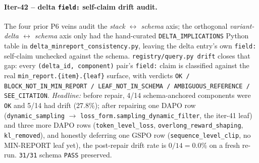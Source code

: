 \paragraph{Iter-42 -- delta \texttt{field:} self-claim drift audit.}
The four prior P6 veins audit the \emph{stack $\leftrightarrow$ schema} axis;
the orthogonal \emph{variant-delta $\leftrightarrow$ schema} axis only had the
hand-curated \texttt{DELTA\_IMPLICATIONS} Python table in
\texttt{delta\_minreport\_consistency.py}, leaving the delta entry's
own \texttt{field:} self-claim unchecked against the schema.
\texttt{registry/query.py drift} closes that gap: every
\texttt{(delta\_id, component)} pair's \texttt{field:} claim is classified
against the real \texttt{min\_report.\{item\}.\{leaf\}} surface, with verdicts
\texttt{OK / BLOCK\_NOT\_IN\_MIN\_REPORT / LEAF\_NOT\_IN\_SCHEMA /
AMBIGUOUS\_REFERENCE / SEE\_CITATION}.
\emph{Headline:} before repair, 4/14 schema-anchored components were
\texttt{OK} and 5/14 had drift (27.8\%); after repairing one DAPO row
(\texttt{dynamic\_sampling} $\to$ \texttt{loss\_form.sampling\_dynamic\_filter},
the iter-41 leaf) and three more DAPO rows (\texttt{token\_level\_loss},
\texttt{overlong\_reward\_shaping}, \texttt{kl\_removed}), and honestly deferring
one GSPO row (\texttt{sequence\_level\_clip}, no MIN-REPORT leaf yet), the
post-repair drift rate is $0/14 = 0.0\%$ on a fresh re-run. \texttt{31/31}
schema \texttt{PASS} preserved.

\begin{table}[ht]
\centering
\small
{}
\caption{Iter-42 drift repair table. The five drift rows from the
delta-$\leftrightarrow$-schema audit (which run on the 14/18 schema-anchored
components; the other 4 are \texttt{see delta-list and citation} placeholders).
Four DAPO rows absorb the iter-41 schema-bump leaves; one GSPO row honestly
defers because no MIN-REPORT leaf exists for sequence-level clipping yet.}
\label{tab:p6-delta-field-drift}
\end{table}

